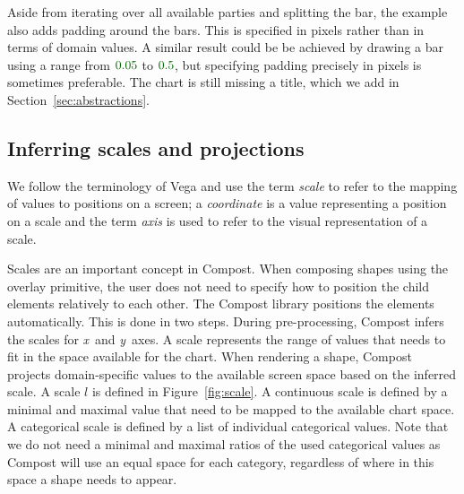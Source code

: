 \documentclass{jfp}
\newcommand{\X}{\emph{x}\ }
\newcommand{\Y}{\emph{y}\ }
\newcommand{\num}[1]{\textcolor{numclr}{#1}}
\newcommand{\kvd}[1]{\textnormal{\textcolor{kvdclr}{\sffamily #1}}}
\begin{document}
\vspace{-0.5em}
\noindent
Aside from iterating over all available parties and splitting the bar, the example also adds padding
around the bars. This is specified in pixels rather than in terms of domain values. A similar
result could be be achieved by drawing a bar using a range from $\num{0.05}$ to $\num{0.5}$, but
specifying padding precisely in pixels is sometimes preferable.
The chart is still missing a title, which we add in Section~\ref{sec:abstractions}.

\subsection{Inferring scales and projections}
\label{sec:basic-scales}

We follow the terminology of Vega \cite{vega} and use the term \emph{scale} to refer to the mapping of
values to positions on a screen; a \emph{coordinate} is a value representing a position on a
scale and the term \emph{axis} is used to refer to the visual representation of a scale.

Scales are an important concept in Compost.
When composing shapes using the \kvd{overlay} primitive, the user does not need to specify how
to position the child elements relatively to each other. The Compost library positions the elements
automatically. This is done in two steps. During pre-processing, Compost infers the scales for
\X and \Y axes. A scale represents the range of values that needs to fit in the space available for
the chart. When rendering a shape, Compost projects domain-specific values to the available screen
space based on the inferred scale. A scale $l$ is defined in Figure~\ref{fig:scale}.
%
A continuous scale is defined by a minimal and maximal value that need to be mapped to the
available chart space. A categorical scale is defined by a list of individual categorical values.
Note that we do not need a minimal and maximal ratios of the used categorical values as Compost
will use an equal space for each category, regardless of where in this space a shape needs to
appear.
\end{document}
